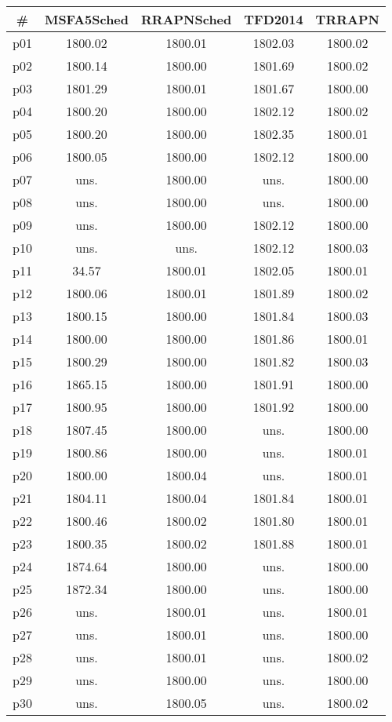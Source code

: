 \begin{tabular}{ccccc}
\toprule
\textbf{\#} & \textbf{MSFA5Sched} & \textbf{RRAPNSched} & \textbf{TFD2014} & \textbf{TRRAPN}\\
\midrule
p01 & 1800.02 & 1800.01 & 1802.03 & 1800.02\\
p02 & 1800.14 & 1800.00 & 1801.69 & 1800.02\\
p03 & 1801.29 & 1800.01 & 1801.67 & 1800.00\\
p04 & 1800.20 & 1800.00 & 1802.12 & 1800.02\\
p05 & 1800.20 & 1800.00 & 1802.35 & 1800.01\\
p06 & 1800.05 & 1800.00 & 1802.12 & 1800.00\\
p07 & uns. & 1800.00 & uns. & 1800.00\\
p08 & uns. & 1800.00 & uns. & 1800.00\\
p09 & uns. & 1800.00 & 1802.12 & 1800.00\\
p10 & uns. & uns. & 1802.12 & 1800.03\\
p11 & 34.57 & 1800.01 & 1802.05 & 1800.01\\
p12 & 1800.06 & 1800.01 & 1801.89 & 1800.02\\
p13 & 1800.15 & 1800.00 & 1801.84 & 1800.03\\
p14 & 1800.00 & 1800.00 & 1801.86 & 1800.01\\
p15 & 1800.29 & 1800.00 & 1801.82 & 1800.03\\
p16 & 1865.15 & 1800.00 & 1801.91 & 1800.00\\
p17 & 1800.95 & 1800.00 & 1801.92 & 1800.00\\
p18 & 1807.45 & 1800.00 & uns. & 1800.00\\
p19 & 1800.86 & 1800.00 & uns. & 1800.01\\
p20 & 1800.00 & 1800.04 & uns. & 1800.01\\
p21 & 1804.11 & 1800.04 & 1801.84 & 1800.01\\
p22 & 1800.46 & 1800.02 & 1801.80 & 1800.01\\
p23 & 1800.35 & 1800.02 & 1801.88 & 1800.01\\
p24 & 1874.64 & 1800.00 & uns. & 1800.00\\
p25 & 1872.34 & 1800.00 & uns. & 1800.00\\
p26 & uns. & 1800.01 & uns. & 1800.01\\
p27 & uns. & 1800.01 & uns. & 1800.00\\
p28 & uns. & 1800.01 & uns. & 1800.02\\
p29 & uns. & 1800.00 & uns. & 1800.00\\
p30 & uns. & 1800.05 & uns. & 1800.02\\
\bottomrule
\end{tabular}


